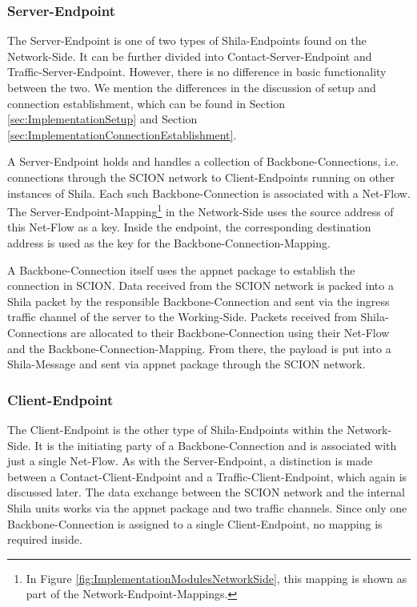 \subsubsection{Server-Endpoint}

The Server-Endpoint is one of two types of Shila-Endpoints found on the Network-Side. It can be further divided into Contact-Server-Endpoint and Traffic-Server-Endpoint. However, there is no difference in basic functionality between the two. We mention the differences in the discussion of setup and connection establishment, which can be found in Section \ref{sec:ImplementationSetup} and Section \ref{sec:ImplementationConnectionEstablishment}.

A Server-Endpoint holds and handles a collection of Backbone-Connections, i.e. connections through the SCION network to Client-Endpoints running on other instances of Shila. Each such Backbone-Connection is associated with a Net-Flow. The Server-Endpoint-Mapping\footnote{In Figure \ref{fig:ImplementationModulesNetworkSide}, this mapping is shown as part of the Network-Endpoint-Mappings.} in the Network-Side uses the source address of this Net-Flow as a key. Inside the endpoint, the corresponding destination address is used as the key for the Backbone-Connection-Mapping. %

A Backbone-Connection itself uses the appnet package \cite{Appnet} to establish the connection in SCION. Data received from the SCION network is packed into a Shila packet by the responsible Backbone-Connection and sent via the ingress traffic channel of the server to the Working-Side. Packets received from Shila-Connections are allocated to their Backbone-Connection using their Net-Flow and the Backbone-Connection-Mapping. From there, the payload is put into a Shila-Message and sent via appnet package through the SCION network.

\subsubsection{Client-Endpoint}

The Client-Endpoint is the other type of Shila-Endpoints within the Network-Side. It is the initiating party of a Backbone-Connection and is associated with just a single Net-Flow. As with the Server-Endpoint, a distinction is made between a Contact-Client-Endpoint and a Traffic-Client-Endpoint, which again is discussed later. The data exchange between the SCION network and the internal Shila units works via the appnet package and two traffic channels. Since only one Backbone-Connection is assigned to a single Client-Endpoint, no mapping is required inside.

